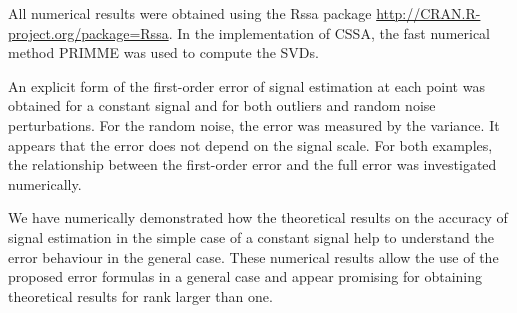 \documentclass[engproc, submit, article,pdftex,moreauthors]{Definitions/mdpi}
\begin{document}
All numerical results were obtained using the Rssa package \url{http://CRAN.R-project.org/package=Rssa}. In the implementation of CSSA, the fast numerical method PRIMME was used to compute the SVDs.


An explicit form of the first-order error of signal estimation at each point was obtained for a constant signal and for both outliers and random noise perturbations. For the random noise, the error was measured by the variance.
It appears that the error does not depend on the signal scale.
For both examples, the relationship between the first-order error and the full error was investigated numerically.

We have numerically demonstrated how the theoretical results on the accuracy of signal estimation in the simple case of a constant signal help to understand the error behaviour in the general case.
These numerical results allow the use of the proposed error formulas in a general case and appear promising for obtaining theoretical results for rank larger than one.




	
\end{document}
